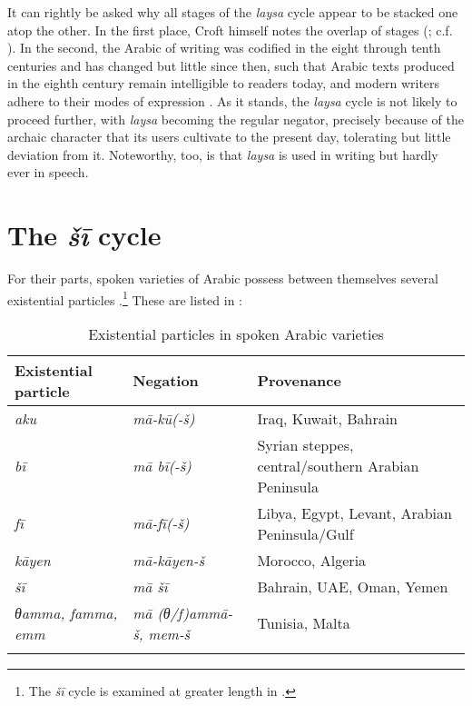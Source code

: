 \documentclass[output=paper]{langsci/langscibook}
\begin{document}
It can rightly be asked why all stages of the \textit{laysa} cycle appear to be stacked one atop the other. In the first place, Croft himself notes the overlap of stages (\citeyear[22]{Croft1991}; c.f. \citealp[146, 149, 151--154]{Veselinova2016}). In the second, the Arabic of writing was codified in the eight through tenth centuries and has changed but little since then, such that Arabic texts produced in the eighth century remain intelligible to readers today, and modern writers adhere to their modes of expression \citep[340]{wilmsen2016a}. As it stands, the \textit{laysa} cycle is not likely to proceed further, with \textit{laysa} becoming the regular negator, precisely because of the archaic character that its users cultivate to the present day, tolerating but little deviation from it. Noteworthy, too, is that \textit{laysa} is used in writing but hardly ever in speech.

\section{The \textit{šī} cycle}\label{s:WiAR-3}

For their parts, spoken varieties of Arabic possess between themselves several existential particles \citep{eid2008a}.\footnote{The \textit{šī} cycle is examined at greater length in \citet{wilmsen2020a}.} These are listed in :

\begin{table}[h]
	\centering
	\caption{Existential particles in spoken Arabic varieties}
	\label{tab:WiAR-1}
\begin{tabularx}{\textwidth}{llQ}
\lsptoprule
\textbf{Existential particle} & \textbf{Negation} & \textbf{Provenance} \\ \midrule
\textit{aku} & \textit{mā-kū(-š)} & Iraq, Kuwait, Bahrain \\
\textit{bī} & \textit{mā bī(-š)} & Syrian steppes, central/southern Arabian Peninsula \\
\textit{fī} & \textit{mā-fī(-š)} & Libya, Egypt, Levant, Arabian Peninsula/Gulf \\
\textit{kāyen} & \textit{mā-kāyen-š} & Morocco, Algeria \\
\textit{šī} & \textit{mā šī} & Bahrain, UAE, Oman, Yemen \\
\textit{θamma, famma, emm} & \textit{mā (θ/f)ammā-š, mem-š} & Tunisia, Malta \\ \lspbottomrule   
\end{tabularx}
\end{table}
\end{document}
